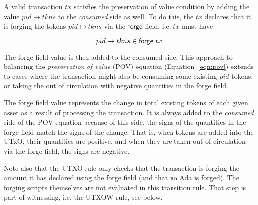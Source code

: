 A valid transaction $tx$ satisfies the preservation of value
condition by adding the value $pid \mapsto tkns$ to the \textit{consumed} side as well.
To do this, the $tx$ declares that it is forging the tokens $pid \mapsto tkns$
via the $\mathsf{forge}$ field, i.e. $tx$ must have

\[pid \mapsto tkns\in\mathsf{forge}~tx\]

The forge field value is then added to the consumed side. This approach
to balancing the \emph{preservation of value} (POV) equation (Equation~\ref{eqn:pov}) extends
to cases where the transaction might also be consuming some existing $pid$ tokens,
or taking the out of circulation with negative quantities in the forge field.

The forge field value represents the change in total existing tokens of each given asset
as a result of processing the transaction. It is always added to the
\textit{consumed} side of the POV equation because of this side, the signs of the
quantities in the forge field match the signs of the change. That is,
when tokens are added into the UTxO, their quantities are positive, and when they are
taken out of circulation via the forge field, the signs are negative.

Note also that the UTXO rule only checks that the transaction is forging the
amount it has declared using the forge field (and that no Ada is forged).
The forging scripts themselves are not evaluated in this transition rule.
That step is part of witnessing, i.e. the UTXOW rule, see below.

